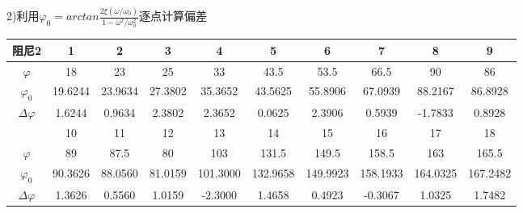 \documentclass[UTF8]{ctexart}
\begin{document}
        2)利用$\varphi_{0}=arctan\frac{2\xi(\omega/\omega_{0})}{1-\omega^{2}/\omega_{0}^{2}}$逐点计算偏差
        \begin{table}[!htbp]
            \centering
            \begin{tabular}{|c|c|c|c|c|c|c|c|c|c|}
            \hline
            阻尼2             & 1        & 2       & 3       & 4        & 5        & 6        & 7        & 8        & 9        \\ \hline
            $\varphi$       & 18       & 23      & 25      & 33       & 43.5     & 53.5     & 66.5     & 90       & 86       \\ \hline
            $\varphi_{0}$   & 19.6244  & 23.9634 & 27.3802 & 35.3652  & 43.5625  & 55.8906  & 67.0939  & 88.2167  & 86.8928  \\ \hline
            $\Delta\varphi$ & 1.6244   & 0.9634  & 2.3802  & 2.3652   & 0.0625   & 2.3906   & 0.5939   & -1.7833  & 0.8928   \\ \hline
                            & 10       & 11      & 12      & 13       & 14       & 15       & 16       & 17       & 18       \\ \hline
            $\varphi$       & 89       & 87.5    & 80      & 103      & 131.5    & 149.5    & 158.5    & 163      & 165.5    \\ \hline
            $\varphi_{0}$   & 90.3626  & 88.0560 & 81.0159 & 101.3000 & 132.9658 & 149.9923 & 158.1933 & 164.0325 & 167.2482 \\ \hline
            $\Delta\varphi$ & 1.3626   & 0.5560  & 1.0159  & -2.3000  & 1.4658   & 0.4923   & -0.3067  & 1.0325   & 1.7482   \\ \hline
            \end{tabular}
        \end{table}
\end{document}
